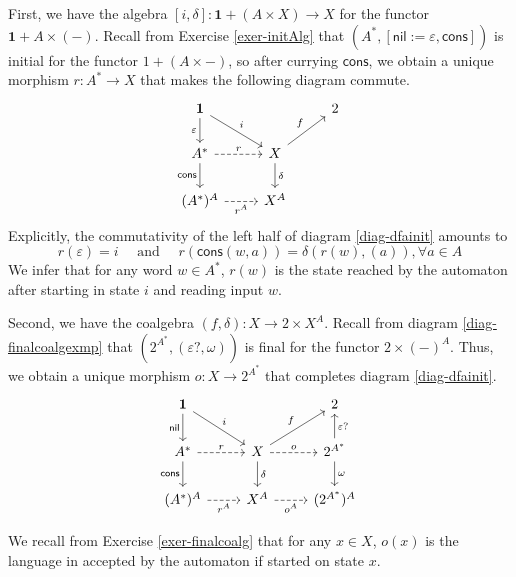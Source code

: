 \documentclass{article}
\theoremstyle{definition}
\theoremstyle{remark}
\begin{document}
First, we have the algebra $[i,\delta]: \mathbf{1}+(A\times X) \rightarrow X$ for the functor $\mathbf{1}+A\times (-)$. Recall from Exercise \ref{exer-initAlg} that $(A^*, [\textsf{nil}:=\varepsilon, \textsf{cons}])$ is initial for the functor $1+(A\times -)$, so after currying $\textsf{cons}$, we obtain a unique morphism $r:A^*\rightarrow X$ that makes the following diagram commute.
\begin{equation}\label{diag-dfainit}
    \begin{tikzcd}
        \mathbf{1} \arrow[rd, "i"] \arrow[d, "\varepsilon"']  &                                       & 2 \\
        A^* \arrow[d, "\textsf{cons}"'] \arrow[r, "r", dashed] & X \arrow[d, "\delta"] \arrow[ru, "f"] &   \\
        (A^*)^A \arrow[r, "r^A"', dashed]                      & X^A                                   &  
        \end{tikzcd}
\end{equation}
Explicitly, the commutativity of the left half of diagram \ref{diag-dfainit} amounts to
\[
r(\varepsilon) = i \quad \text{ and } \quad 
r(\textsf{cons}(w,a)) = \delta(r(w),(a)), \forall a \in A
\]
We infer that for any word $w \in A^*$, $r(w)$ is the state reached by the automaton after starting in state $i$ and reading input $w$.

Second, we have the coalgebra $(f,\delta): X \rightarrow 2 \times X^{A}$. Recall from diagram \ref{diag-finalcoalgexmp} that $(2^{A^*}, (\varepsilon?, \omega))$ is final for the functor $2\times (-)^A$. Thus, we obtain a unique morphism $o:X \rightarrow 2^{A^*}$ that completes diagram \ref{diag-dfainit}.
\begin{equation}\label{diag-dfainitfinal}
	\begin{tikzcd}
 \mathbf{1} \arrow[rd, "i"] \arrow[d, "\textsf{nil}"'] & & 2 \\
 A^* \arrow[d, "\textsf{cons}"'] \arrow[r, "r", dashed] & X \arrow[d, "\delta"] \arrow[ru, "f"] \arrow[r, "o", dashed] & 2^{A^*} \arrow[u, "\varepsilon?"'] \arrow[d, "\omega"] \\
 (A^*)^A \arrow[r, "r^A"', dashed] & X^A \arrow[r, "o^A"', dashed] & (2^{A^*})^A 
 \end{tikzcd}
\end{equation}

We recall from Exercise \ref{exer-finalcoalg} that for any $x \in X$, $o(x)$ is the language in accepted by the automaton if started on state $x$.
\end{document}
